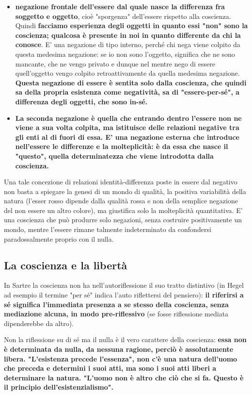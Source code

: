 \begin{itemize}
	\item \textbf{negazione frontale dell'essere dal quale
	nasce la differenza fra soggetto e oggetto},
	cioè "sporgenza" dell'essere rispetto alla
	coscienza. Quindi \textbf{facciamo esperienza degli
	oggetti in quanto essi "non" sono la coscienza;
	qualcosa è presente in noi in quanto differente
	da chi la conosce}. E' una negazione di tipo interno,
	perché chi nega viene colpito da questa medesima
	negazione: se io non sono l'oggetto, significa
	che ne sono mancante, che ne vengo privato
	e dunque nel mentre nego di essere quell'oggetto
	vengo colpito retroattivamente da quella
	medesima negazione. \textbf{Questa negazione di essere è sentita solo dalla coscienza, che quindi sa della propria esistenza come negatività, sa di "essere-per-sé", a differenza degli oggetti, che sono in-sé.}
	\item \textbf{La seconda negazione è quella che entrando
	dentro l'essere non ne viene a sua
	volta colpita, ma istituisce delle relazioni
	negative tra gli enti al di fuori di essa.
	E' una negazione esterna che introduce nell'essere le differenze e la molteplicità: è da
	essa che nasce il "questo", quella
	determinatezza che viene introdotta
	dalla coscienza.}
\end{itemize}

Una tale concezione di relazioni identità-differenza
poste in essere dal negativo non basta a spiegare
la genesi di un mondo di qualità, la positiva
variabilità della natura (l'esser rosso dipende
dalla qualità rossa e non della semplice negazione
del non essere un altro colore), ma giustifica
solo la molteplicità quantitativa. E' una coscienza
che può produrre solo negazioni, senza
costruire positivamente un mondo, mentre
l'essere rimane talmente indeterminato
da confondersi paradossalmente proprio con
il nulla.

\subsection{La coscienza e la libertà}

In Sartre la coscienza non ha nell'autoriflessione
il suo tratto distintivo (in Hegel ad esempio il termine
"per sé" indica l'auto riflettersi del pensiero): \textbf{il
riferirsi a sé significa l'immediata presenza a se
stesso della coscienza, senza mediazione alcuna, in modo
pre-riflessivo} (se fosse riflessione mediata dipenderebbe da altro).

Non la riflessione su di sé ma il nulla è il
vero carattere della coscienza: \textbf{essa non è determinata
da nulla, da nessuna ragione, perciò è assolutamente libera.
"L'esistenza precede l'essenza", non c'è una natura
dell'uomo che preceda e determini i suoi atti, ma
sono i suoi atti liberi a determinare la natura.
"L'uomo non è altro che ciò che si fa. Questo è
il principio dell'esistenzialismo".}

